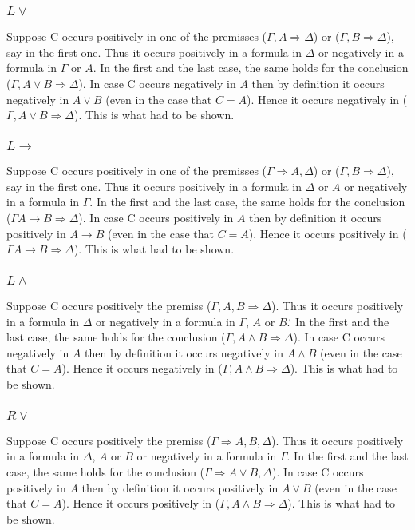 \documentclass{article}
\begin{document}
\subsubsection{$L\vee$}
Suppose C occurs positively in one of the premisses
($\Gamma, A \Rightarrow \Delta$) or ($\Gamma, B \Rightarrow \Delta$),
say in the first one. Thus it occurs positively in a formula in $\Delta$ or 
negatively in a formula in $\Gamma$ or $A$. In the first and the last case,
the same holds for the conclusion ($\Gamma, A \vee B \Rightarrow \Delta$).
In case C occurs negatively in $A$ then by definition it occurs negatively
in $A \vee B$ (even in the case that $C = A$). Hence it occurs negatively
in ($\Gamma, A \vee B \Rightarrow \Delta$). This is what had to be shown.

\subsubsection{$L\to$}
Suppose C occurs positively in one of the premisses
($\Gamma \Rightarrow A, \Delta$) or ($\Gamma, B \Rightarrow \Delta$),
say in the first one. Thus it occurs positively in a formula in $\Delta$ or
$A$ or negatively in a formula in $\Gamma$. In the first and the last case,
the same holds for the conclusion ($\Gamma A \to B \Rightarrow \Delta$).
In case C occurs positively in $A$ then by definition it occurs positively
in $A \to B$ (even in the case that $C = A$). Hence it occurs positively
in ($\Gamma A \to B \Rightarrow \Delta$). This is what had to be shown.

\subsubsection{$L\wedge$}
Suppose C occurs positively the premiss
($\Gamma, A, B \Rightarrow \Delta$). Thus it occurs positively in a formula
in $\Delta$ or negatively in a formula in $\Gamma$, $A$ or $B$.`
In the first and the last case,
the same holds for the conclusion ($\Gamma, A \wedge B \Rightarrow \Delta$).
In case C occurs negatively in $A$ then by definition it occurs negatively
in $A \wedge B$ (even in the case that $C = A$). Hence it occurs negatively
in ($\Gamma, A \wedge B \Rightarrow \Delta$). This is what had to be shown.

\subsubsection{$R\vee$}
Suppose C occurs positively the premiss
($\Gamma \Rightarrow A, B, \Delta$). Thus it occurs positively in a formula
in $\Delta$, $A$ or $B$ or negatively in a formula in $\Gamma$.
In the first and the last case,
the same holds for the conclusion ($\Gamma \Rightarrow A \vee B, \Delta$).
In case C occurs positively in $A$ then by definition it occurs positively
in $A \vee B$ (even in the case that $C = A$). Hence it occurs positively
in ($\Gamma, A \wedge B \Rightarrow \Delta$). This is what had to be shown.
\end{document}
